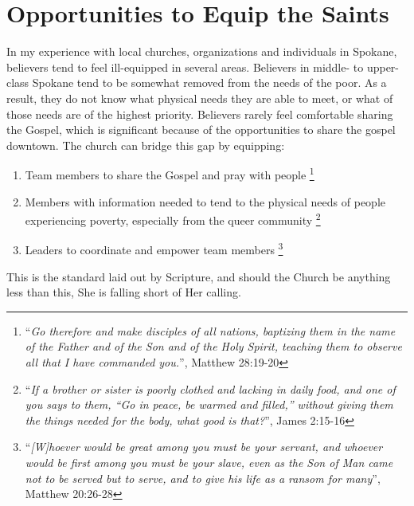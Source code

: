 
\section{Opportunities to Equip the Saints}

    In my experience with local churches, organizations and individuals in Spokane, believers tend to feel ill-equipped in several areas.
    Believers in middle- to upper-class Spokane tend to be somewhat removed from the needs of the poor.
    As a result, they do not know what physical needs they are able to meet, or what of those needs are of the highest priority.
    Believers rarely feel comfortable sharing the Gospel, which is significant because of the opportunities to share the gospel downtown.
    The church can bridge this gap by equipping:
    \begin{enumerate}
        \item Team members to share the Gospel and pray with people
          \footnote{``\textit{Go therefore and make disciples of all nations, baptizing them in the name of the Father and of the Son and of the Holy Spirit, teaching them to observe all that I have commanded you.}'', Matthew 28:19-20}
        \item Members with information needed to tend to the physical needs of people experiencing poverty, especially from the queer community
          \footnote{``\textit{If a brother or sister is poorly clothed and lacking in daily food, and one of you says to them, “Go in peace, be warmed and filled,” without giving them the things needed for the body, what good is that?}'', James 2:15-16}
        \item Leaders to coordinate and empower team members
          \footnote{``\textit{[W]hoever would be great among you must be your servant, and whoever would be first among you must be your slave, even as the Son of Man came not to be served but to serve, and to give his life as a ransom for many}'', Matthew 20:26-28}
    \end{enumerate}
    This is the standard laid out by Scripture, and should the Church be anything less than this, She is falling short of Her calling.

\qJamesOneTwentySeven
